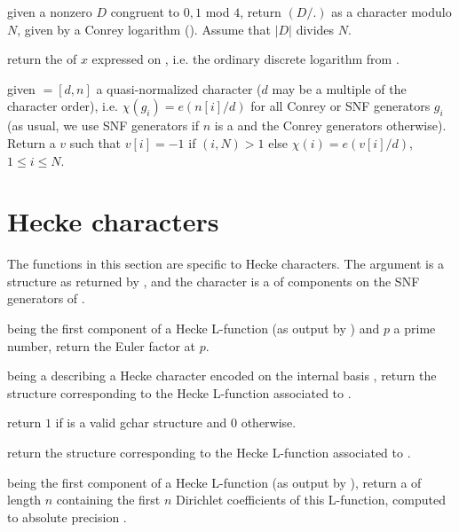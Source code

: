  given a nonzero  $D$ congruent
to $0,1$ mod $4$, return $(D/.)$ as a character modulo $N$, given by a Conrey
logarithm (). Assume that $|D|$ divides $N$.

 return the  of $x$
expressed on , i.e. the ordinary discrete logarithm
from .

given  $= [d,n]$ a quasi-normalized character ($d$
may be a multiple of the character order), i.e. $\chi(g_i) = e(n[i]/d)$
for all Conrey or SNF generators $g_i$ (as usual, we use SNF generators
if $n$ is a  and the Conrey generators otherwise).
Return a  $v$ such that $v[i] = -1$ if $(i,N) > 1$ else
$\chi(i) = e(v[i]/d)$, $1 \leq i \leq N$.

\section{Hecke characters}

The functions in this section are specific to Hecke characters. The
argument  is a  structure as returned by
, and the character  is a 
of components on the SNF generators of .

  being the
first component of a Hecke L-function  (as output by
) and $p$ a prime number, return the Euler factor
at $p$.

  being a
 describing a Hecke character encoded on the internal
basis , return the 
structure corresponding to the Hecke L-function associated to .

 return $1$ if  is a valid
gchar structure and $0$ otherwise.

 return the  structure
corresponding to the Hecke L-function associated to .

  being the
first component of a Hecke L-function  (as output by
), return a  of length $n$ containing the
first $n$ Dirichlet coefficients of this L-function, computed to
absolute precision .

